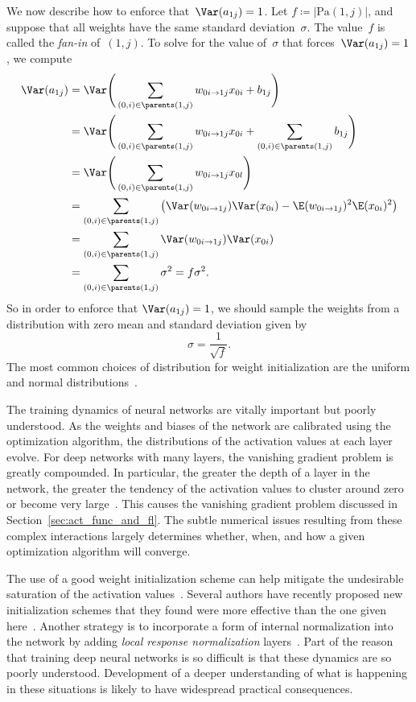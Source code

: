 \documentclass[11pt,a4paper]{article}
\numberwithin{equation}{section}
\newcommand{\weight}[2]{w_{#1 \rightarrow #2}}
\begin{document}
We now describe how to enforce that~$\Var(a_{1j}) = 1$. Let $f \coloneqq
|\text{Pa}(1, j)|$, and suppose that all weights have the same standard
deviation~$\sigma$. The value~$f$ is called the \emph{fan-in} of~$(1, j)$. To
solve for the value of~$\sigma$ that forces~$\Var(a_{1j}) = 1$, we compute
\begin{align*}
	\Var(a_{1j})
	&= \Var\Bigg(\sum_{(0, i) \in \parents(1, j)} \weight{0i}{1j} x_{0i} + b_{1j}\Bigg) \\
	&= \Var\Bigg(
		\sum_{(0, i) \in \parents(1, j)} \weight{0i}{1j} x_{0i} +
		\sum_{(0, i) \in \parents(1, j)} b_{1j}
	\Bigg) \\
	&= \Var\Bigg(\sum_{(0, i) \in \parents(1, j)} \weight{0i}{1j} x_{0l}\Bigg)\\
	&= \sum_{(0, i) \in \parents(1, j)} \left(
		\Var(\weight{0i}{1j}) \Var(x_{0i}) -
		\E(\weight{0i}{1j})^2 \E(x_{0i})^2
	\right) \\
	&= \sum_{(0, i) \in \parents(1, j)} \Var(\weight{0i}{1j}) \Var(x_{0i}) \\
	&= \sum_{(0, i) \in \parents(1, j)} \sigma^2 = f \sigma^2.
\end{align*}
So in order to enforce that $\Var(a_{1j}) = 1$, we should sample the weights
from a distribution with zero mean and standard deviation given by
\begin{equation}
	\sigma = \frac{1}{\sqrt{f}}.
	\label{eq:weight_stddev}
\end{equation}
The most common choices of distribution for weight initialization are the
uniform and normal distributions~\citep{lecun-98b, krizhevsky2012imagenet}.

The training dynamics of neural networks are vitally important but poorly
understood. As the weights and biases of the network are calibrated using the
optimization algorithm, the distributions of the activation values at each layer
evolve. For deep networks with many layers, the vanishing gradient problem is
greatly compounded. In particular, the greater the depth of a layer in the
network, the greater the tendency of the activation values to cluster around
zero or become very large~\citep{glorot2010understanding}. This causes the
vanishing gradient problem discussed in
Section~\ref{sec:act_func_and_fl}. The subtle numerical issues
resulting from these complex interactions largely determines whether, when, and
how a given optimization algorithm will converge.

The use of a good weight initialization scheme can help mitigate the undesirable
saturation of the activation values~\citep{glorot2010understanding}. Several
authors have recently proposed new initialization schemes that they found were
more effective than the one given here~\citep{glorot2010understanding,
martens2010deep}. Another strategy is to incorporate a form of internal
normalization into the network by adding \emph{local response normalization}
layers~\citep{krizhevsky2012imagenet}. Part of the reason that training deep
neural networks is so difficult is that these dynamics are so poorly understood.
Development of a deeper understanding of what is happening in these situations
is likely to have widespread practical consequences.
\end{document}
